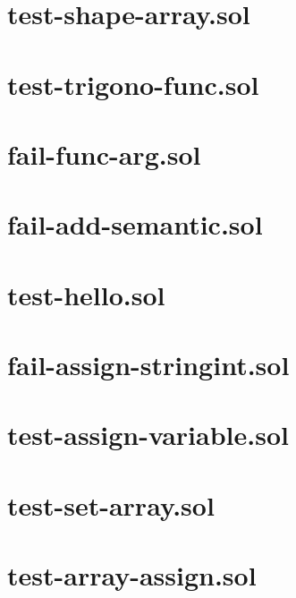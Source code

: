 \section{test-shape-array.sol}


\section{test-trigono-func.sol}


\section{fail-func-arg.sol}


\section{fail-add-semantic.sol}


\section{test-hello.sol}


\section{fail-assign-stringint.sol}


\section{test-assign-variable.sol}


\section{test-set-array.sol}


\section{test-array-assign.sol}


